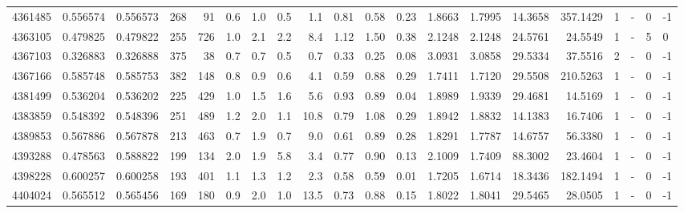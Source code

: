 \begin{tabular}{rrrrrrrrrrrrrrrrrlrl}
   4361485 & 0.556574 &   0.556573 &  268 &   91 &      0.6 &      1.0 &     0.5 &      1.1 &       0.81 &        0.58 &        0.23 &  1.8663 &  1.7995 &   14.3658 &  357.1429 &       1 &             - &        0 &        -1 \\
   4363105 & 0.479825 &   0.479822 &  255 &  726 &      1.0 &      2.1 &     2.2 &      8.4 &       1.12 &        1.50 &        0.38 &  2.1248 &  2.1248 &   24.5761 &   24.5549 &       1 &             - &        5 &         0 \\
   4367103 & 0.326883 &   0.326888 &  375 &   38 &      0.7 &      0.7 &     0.5 &      0.7 &       0.33 &        0.25 &        0.08 &  3.0931 &  3.0858 &   29.5334 &   37.5516 &       2 &             - &        0 &        -1 \\
   4367166 & 0.585748 &   0.585753 &  382 &  148 &      0.8 &      0.9 &     0.6 &      4.1 &       0.59 &        0.88 &        0.29 &  1.7411 &  1.7120 &   29.5508 &  210.5263 &       1 &             - &        0 &        -1 \\
   4381499 & 0.536204 &   0.536202 &  225 &  429 &      1.0 &      1.5 &     1.6 &      5.6 &       0.93 &        0.89 &        0.04 &  1.8989 &  1.9339 &   29.4681 &   14.5169 &       1 &             - &        0 &        -1 \\
   4383859 & 0.548392 &   0.548396 &  251 &  489 &      1.2 &      2.0 &     1.1 &     10.8 &       0.79 &        1.08 &        0.29 &  1.8942 &  1.8832 &   14.1383 &   16.7406 &       1 &             - &        0 &        -1 \\
   4389853 & 0.567886 &   0.567878 &  213 &  463 &      0.7 &      1.9 &     0.7 &      9.0 &       0.61 &        0.89 &        0.28 &  1.8291 &  1.7787 &   14.6757 &   56.3380 &       1 &             - &        0 &        -1 \\
   4393288 & 0.478563 &   0.588822 &  199 &  134 &      2.0 &      1.9 &     5.8 &      3.4 &       0.77 &        0.90 &        0.13 &  2.1009 &  1.7409 &   88.3002 &   23.4604 &       1 &             - &        0 &        -1 \\
   4398228 & 0.600257 &   0.600258 &  193 &  401 &      1.1 &      1.3 &     1.2 &      2.3 &       0.58 &        0.59 &        0.01 &  1.7205 &  1.6714 &   18.3436 &  182.1494 &       1 &             - &        0 &        -1 \\
   4404024 & 0.565512 &   0.565456 &  169 &  180 &      0.9 &      2.0 &     1.0 &     13.5 &       0.73 &        0.88 &        0.15 &  1.8022 &  1.8041 &   29.5465 &   28.0505 &       1 &             - &        0 &        -1 \\

\end{tabular}
